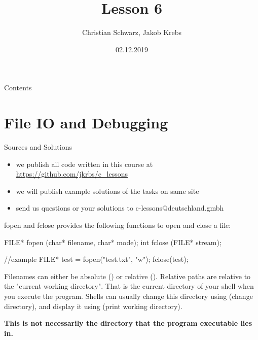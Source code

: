 \documentclass[10pt,graphics,aspectratio=169,table]{beamer}
\title{Lesson 6}
\author{Christian Schwarz, Jakob Krebs}
\date{02.12.2019}
\begin{document}
\maketitle

\begin{frame}{Contents}
    \tableofcontents
\end{frame}


\section{File IO and Debugging}
\begin{frame}{Sources and Solutions}
    \begin{itemize}
        \item we publish all code written in this course at \url{https://github.com/jkrbs/c_lessons}
        \item we will publish example solutions of the tasks on same site
        \item send us questions or your solutions to c-lessons@deutschland.gmbh
    \end{itemize}
\end{frame}

\begin{frame}[fragile]{fopen and fclose}
     provides the following functions to open and close a file:

    \begin{codeblock}
FILE* fopen (char* filename, char* mode);
int fclose (FILE* stream);

//example
FILE* test = fopen("test.txt", "w");
fclose(test);
    \end{codeblock}

    Filenames can either be absolute () 
    or relative (). 
    Relative paths are relative to the "current working directory".
    That is the current directory of your shell when you execute the program.
    Shells can usually change this directory using  (change directory), 
    and display it using  (print working directory).


    \textbf{This is not necessarily the directory that the program executable lies in.}  
\end{frame}
    
\end{document}
